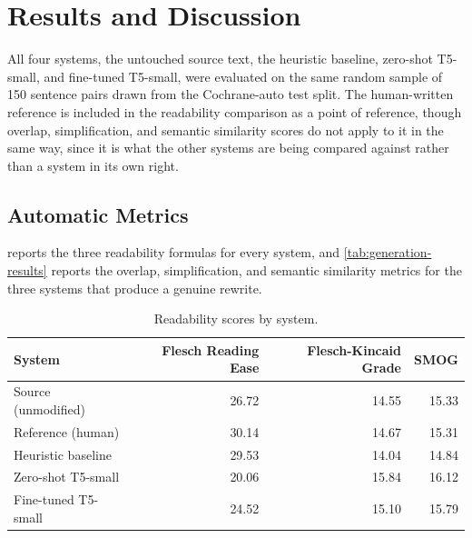 \chapter{Results and Discussion}
\label{ch:results-discussion}

All four systems, the untouched source text, the heuristic baseline, zero-shot T5-small, and fine-tuned T5-small, were evaluated on the same random sample of 150 sentence pairs drawn from the Cochrane-auto test split. The human-written reference is included in the readability comparison as a point of reference, though overlap, simplification, and semantic similarity scores do not apply to it in the same way, since it is what the other systems are being compared against rather than a system in its own right.

\section{Automatic Metrics}
\label{sec:automatic-results}

 reports the three readability formulas for every system, and \cref{tab:generation-results} reports the overlap, simplification, and semantic similarity metrics for the three systems that produce a genuine rewrite.

\begin{table}[htbp]
    \centering
    \caption{Readability scores by system.}
    \label{tab:readability-results}
    \begin{tabular}{@{}lrrr@{}}
        \toprule
        \textbf{System} & \textbf{Flesch Reading Ease} & \textbf{Flesch-Kincaid Grade} & \textbf{SMOG} \\
        \midrule
        Source (unmodified)        & 26.72 & 14.55 & 15.33 \\
        Reference (human)          & 30.14 & 14.67 & 15.31 \\
        Heuristic baseline         & 29.53 & 14.04 & 14.84 \\
        Zero-shot T5-small         & 20.06 & 15.84 & 16.12 \\
        Fine-tuned T5-small        & 24.52 & 15.10 & 15.79 \\
        \bottomrule
    \end{tabular}
\end{table}


